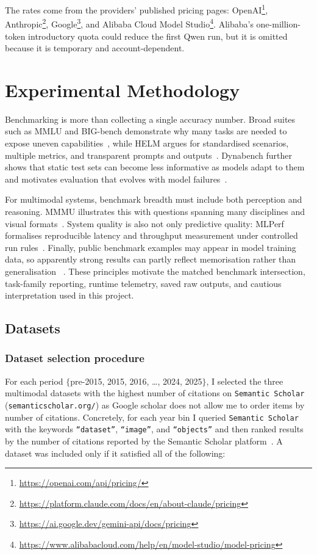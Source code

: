 ﻿\documentclass[11pt,a4paper]{article}
\begin{document}
The rates come from the providers' published pricing pages:
OpenAI\footnote{\url{https://openai.com/api/pricing/}},
Anthropic\footnote{\url{https://platform.claude.com/docs/en/about-claude/pricing}},
Google\footnote{\url{https://ai.google.dev/gemini-api/docs/pricing}}, and
Alibaba Cloud Model Studio\footnote{\url{https://www.alibabacloud.com/help/en/model-studio/model-pricing}}.
Alibaba's one-million-token introductory quota could reduce the first Qwen
run, but it is omitted because it is temporary and account-dependent.



\section{Experimental Methodology}

Benchmarking is more than collecting a single accuracy number. Broad suites
such as MMLU and BIG-bench demonstrate why many tasks are needed to expose
uneven capabilities~\cite{hendrycks2020mmlu,srivastava2022bigbench}, while
HELM argues for standardised scenarios, multiple metrics, and transparent
prompts and outputs~\cite{liang2022helm}. Dynabench further shows that static
test sets can become less informative as models adapt to them and motivates
evaluation that evolves with model failures~\cite{kiela2021dynabench}.

For multimodal systems, benchmark breadth must include both perception and
reasoning. MMMU illustrates this with questions spanning many disciplines and
visual formats~\cite{yue2023mmmu}. System quality is also not only predictive
quality: MLPerf formalises reproducible latency and throughput measurement
under controlled run rules~\cite{reddi2019mlperf}. Finally, public benchmark
examples may appear in model training data, so apparently strong results can
partly reflect memorisation rather than generalisation
~\cite{li2023contamination}. These principles motivate the matched benchmark
intersection, task-family reporting, runtime telemetry, saved raw outputs,
and cautious interpretation used in this project.

\subsection{Datasets}
\subsubsection{Dataset selection procedure}

For each period $\{$pre-2015, 2015, 2016, \dots, 2024, 2025$\}$, I selected the three multimodal datasets with the highest number of citations on \texttt{Semantic Scholar} (\texttt{semanticscholar.org/}) as Google scholar does not allow me to order items by number of citations. Concretely, for each year bin I queried \texttt{Semantic Scholar} with the keywords \texttt{``dataset''}, \texttt{``image''}, and \texttt{``objects''} and then ranked results by the number of citations reported by the Semantic Scholar platform~\cite{kinney2023semanticscholar}. A dataset was included only if it satisfied all of the following:
\end{document}
